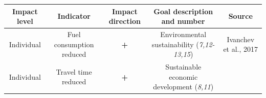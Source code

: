 \documentclass[
]{book}
\begin{document}
\begin{longtable}[]{@{}ccccc@{}}
\toprule
\begin{minipage}[b]{0.17\columnwidth}\centering
Impact level\strut
\end{minipage} & \begin{minipage}[b]{0.16\columnwidth}\centering
Indicator\strut
\end{minipage} & \begin{minipage}[b]{0.17\columnwidth}\centering
Impact direction\strut
\end{minipage} & \begin{minipage}[b]{0.17\columnwidth}\centering
Goal description and number\strut
\end{minipage} & \begin{minipage}[b]{0.17\columnwidth}\centering
Source\strut
\end{minipage}\tabularnewline
\midrule
\endhead
\begin{minipage}[t]{0.17\columnwidth}\centering
Individual\strut
\end{minipage} & \begin{minipage}[t]{0.16\columnwidth}\centering
Fuel consumption reduced\strut
\end{minipage} & \begin{minipage}[t]{0.17\columnwidth}\centering
\textbf{+}\strut
\end{minipage} & \begin{minipage}[t]{0.17\columnwidth}\centering
Environmental sustainability (\emph{7,12-13,15})\strut
\end{minipage} & \begin{minipage}[t]{0.17\columnwidth}\centering
Ivanchev et al., 2017\strut
\end{minipage}\tabularnewline
\begin{minipage}[t]{0.17\columnwidth}\centering
Individual\strut
\end{minipage} & \begin{minipage}[t]{0.16\columnwidth}\centering
Travel time reduced\strut
\end{minipage} & \begin{minipage}[t]{0.17\columnwidth}\centering
\textbf{+}\strut
\end{minipage} & \begin{minipage}[t]{0.17\columnwidth}\centering
Sustainable economic development (\emph{8,11})\strut
\end{minipage} & \begin{minipage}[t]{0.17\columnwidth}\centering

\end{minipage}
\end{longtable}
\end{document}
